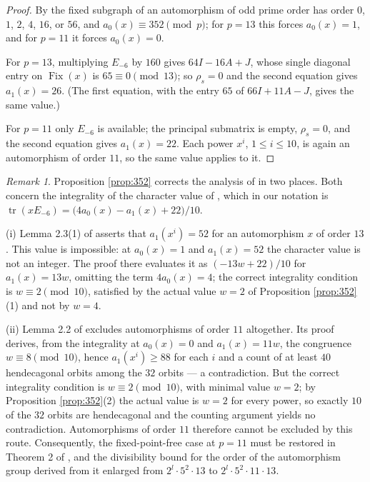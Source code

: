 \documentclass[11pt]{article}
\theoremstyle{plain}
\theoremstyle{remark}
\newtheorem{remark}[theorem]{Remark}
\newcommand{\Fix}{\operatorname{Fix}}
\newcommand{\tr}{\operatorname{tr}}
\begin{document}
\begin{proof}
By \cite[\S2]{MakhnevNosov2004} the fixed subgraph of an automorphism of odd prime order has order $0$, $1$, $2$, $4$, $16$, or $56$,
and $a_0(x)\equiv 352\pmod p$;
for $p=13$ this forces $a_0(x)=1$, and for $p=11$ it forces $a_0(x)=0$.

For $p=13$, multiplying $E_{-6}$ by $160$ gives $64I-16A+J$, whose single diagonal entry on $\Fix(x)$ is $65\equiv 0\pmod{13}$;
so $\rho_s=0$ and the second equation gives $a_1(x)=26$.
(The first equation, with the entry $65$ of $66I+11A-J$, gives the same value.)

For $p=11$ only $E_{-6}$ is available; the principal submatrix is empty, $\rho_s=0$,
and the second equation gives $a_1(x)=22$.
Each power $x^i$, $1\le i\le 10$, is again an automorphism of order $11$, so the same value applies to it.
\end{proof}

\begin{remark}\label{rem:352-errata}
Proposition \ref{prop:352} corrects the analysis of \cite{MakhnevNosov2004} in two places.
Both concern the integrality of the character value of \cite[Lemma 2.1]{MakhnevNosov2004},
which in our notation is $\tr(xE_{-6})=\bigl(4a_0(x)-a_1(x)+22\bigr)/10$.

(i) Lemma 2.3(1) of \cite{MakhnevNosov2004} asserts that $a_1(x^i)=52$ for an automorphism $x$ of order $13$.
This value is impossible: at $a_0(x)=1$ and $a_1(x)=52$ the character value is not an integer.
The proof there evaluates it as $(-13w+22)/10$ for $a_1(x)=13w$,
omitting the term $4a_0(x)=4$;
the correct integrality condition is $w\equiv 2\pmod{10}$,
satisfied by the actual value $w=2$ of Proposition \ref{prop:352}(1) and not by $w=4$.

(ii) Lemma 2.2 of \cite{MakhnevNosov2004} excludes automorphisms of order $11$ altogether.
Its proof derives, from the integrality at $a_0(x)=0$ and $a_1(x)=11w$, the congruence $w\equiv 8\pmod{10}$,
hence $a_1(x^i)\ge 88$ for each $i$ and a count of at least $40$ hendecagonal orbits among the $32$ orbits --- a contradiction.
But the correct integrality condition is $w\equiv 2\pmod{10}$,
with minimal value $w=2$;
by Proposition \ref{prop:352}(2) the actual value is $w=2$ for every power,
so exactly $10$ of the $32$ orbits are hendecagonal and the counting argument yields no contradiction.
Automorphisms of order $11$ therefore cannot be excluded by this route.
Consequently, the fixed-point-free case at $p=11$ must be restored in Theorem 2 of \cite{MakhnevNosov2004},
and the divisibility bound for the order of the automorphism group derived from it enlarged from $2^l\cdot5^2\cdot13$ to $2^l\cdot5^2\cdot11\cdot13$.
\end{remark}
\end{document}
